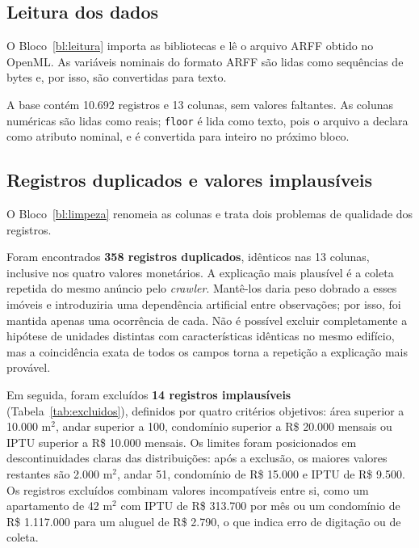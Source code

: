 \documentclass[12pt,a4paper]{article}
\begin{document}
\subsection{Leitura dos dados}

O Bloco~\ref{bl:leitura} importa as bibliotecas e lê o arquivo ARFF obtido no OpenML. As variáveis nominais do formato ARFF são lidas como sequências de bytes e, por isso, são convertidas para texto.



A base contém 10.692 registros e 13 colunas, sem valores faltantes. As colunas numéricas são lidas como reais; \texttt{floor} é lida como texto, pois o arquivo a declara como atributo nominal, e é convertida para inteiro no próximo bloco.

\subsection{Registros duplicados e valores implausíveis}
\label{sec:limpeza}

O Bloco~\ref{bl:limpeza} renomeia as colunas e trata dois problemas de qualidade dos registros.



Foram encontrados \textbf{358 registros duplicados}, idênticos nas 13 colunas, inclusive nos quatro valores monetários. A explicação mais plausível é a coleta repetida do mesmo anúncio pelo \textit{crawler}. Mantê-los daria peso dobrado a esses imóveis e introduziria uma dependência artificial entre observações; por isso, foi mantida apenas uma ocorrência de cada. Não é possível excluir completamente a hipótese de unidades distintas com características idênticas no mesmo edifício, mas a coincidência exata de todos os campos torna a repetição a explicação mais provável.

Em seguida, foram excluídos \textbf{14 registros implausíveis} (Tabela~\ref{tab:excluidos}), definidos por quatro critérios objetivos: área superior a 10.000 m$^2$, andar superior a 100, condomínio superior a R\$ 20.000 mensais ou IPTU superior a R\$ 10.000 mensais. Os limites foram posicionados em descontinuidades claras das distribuições: após a exclusão, os maiores valores restantes são 2.000 m$^2$, andar 51, condomínio de R\$ 15.000 e IPTU de R\$ 9.500. Os registros excluídos combinam valores incompatíveis entre si, como um apartamento de 42 m$^2$ com IPTU de R\$ 313.700 por mês ou um condomínio de R\$ 1.117.000 para um aluguel de R\$ 2.790, o que indica erro de digitação ou de coleta.
\end{document}
